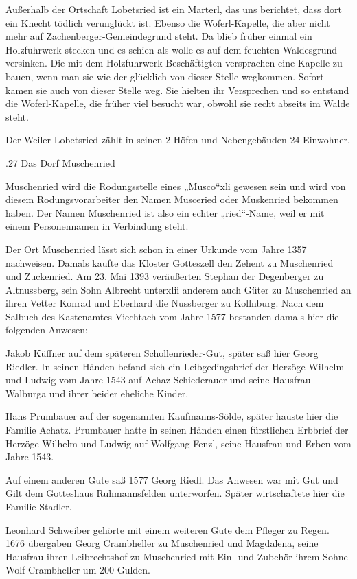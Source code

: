 \documentclass{book}
\begin{document}
Außerhalb der Ortschaft Lobetsried ist ein Marterl, das uns berichtet, dass dort
ein Knecht tödlich verunglückt ist. Ebenso die Woferl-Kapelle, die aber nicht
mehr auf Zachenberger-Gemeindegrund steht. Da blieb früher einmal ein
Holzfuhrwerk stecken und es schien als wolle es auf dem feuchten Waldesgrund
versinken. Die mit dem Holzfuhrwerk Beschäftigten versprachen eine Kapelle zu
bauen, wenn man sie wie der glücklich von dieser Stelle wegkommen. Sofort kamen
sie auch von dieser Stelle weg. Sie hielten ihr Versprechen und so entstand die
Woferl-Kapelle, die früher viel besucht war, obwohl sie recht abseits im Walde
steht.

Der Weiler Lobetsried zählt in seinen 2 Höfen und Nebengebäuden 24 Einwohner.

.27 Das Dorf Muschenried

Muschenried wird die Rodungsstelle eines „Musco“xli gewesen sein und wird von
diesem Rodungsvorarbeiter den Namen Musceried oder Muskenried bekommen haben.
Der Namen Muschenried ist also ein echter „ried“-Name, weil er mit einem
Personennamen in Verbindung steht.

Der Ort Muschenried lässt sich schon in einer Urkunde vom Jahre 1357 nachweisen.
Damals kaufte das Kloster Gotteszell den Zehent zu Muschenried und Zuckenried.
Am 23. Mai 1393 veräußerten Stephan der Degenberger zu Altnussberg, sein Sohn
Albrecht unterxlii anderem auch Güter zu Muschenried an ihren Vetter Konrad und
Eberhard die Nussberger zu Kollnburg. Nach dem Salbuch des Kastenamtes Viechtach
vom Jahre 1577 bestanden damals hier die folgenden Anwesen:



Jakob Küffner auf dem späteren Schollenrieder-Gut, später saß hier Georg
Riedler. In seinen Händen befand sich ein Leibgedingsbrief der Herzöge Wilhelm
und Ludwig vom Jahre 1543 auf Achaz Schiederauer und seine Hausfrau Walburga und
ihrer beider eheliche Kinder.

Hans Prumbauer auf der sogenannten Kaufmanns-Sölde, später hauste hier die
Familie Achatz. Prumbauer hatte in seinen Händen einen fürstlichen Erbbrief der
Herzöge Wilhelm und Ludwig auf Wolfgang Fenzl, seine Hausfrau und Erben vom
Jahre 1543.

Auf einem anderen Gute saß 1577 Georg Riedl. Das Anwesen war mit Gut und Gilt
dem Gotteshaus Ruhmannsfelden unterworfen. Später wirtschaftete hier die Familie
Stadler.

Leonhard Schweiber gehörte mit einem weiteren Gute dem Pfleger zu Regen. 1676
übergaben Georg Crambheller zu Muschenried und Magdalena, seine Hausfrau ihren
Leibrechtshof zu Muschenried mit Ein- und Zubehör ihrem Sohne Wolf Crambheller
um 200 Gulden.
\end{document}
